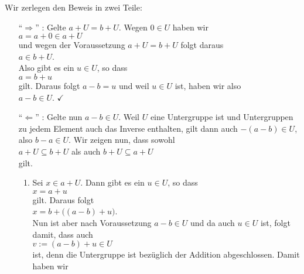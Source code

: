 \proof
Wir zerlegen den Beweis in zwei Teile:
\begin{enumerate}
\item[``$\Rightarrow$'']:
  Gelte $a + U = b + U$.  Wegen $0 \in U$ haben wir
  \\[0.2cm]
  \hspace*{1.3cm}
  $a = a + 0 \in a + U$
  \\[0.2cm]
  und wegen der Voraussetzung $a + U = b + U$ folgt daraus
  \\[0.2cm]
  \hspace*{1.3cm}
  $a \in b + U$.
  \\[0.2cm]
  Also gibt es ein $u \in U$, so dass
  \\[0.2cm]
  \hspace*{1.3cm}
  $a = b + u$
  \\[0.2cm]
  gilt.  Daraus folgt $a - b = u$ und weil $u \in U$ ist, haben wir also
  \\[0.2cm]
  \hspace*{1.3cm}
  $a - b \in U$.  $\checkmark$
\item[``$\Leftarrow$'']: Gelte nun $a - b \in U$.  Weil $U$ eine Untergruppe ist und Untergruppen zu jedem
  Element auch das Inverse enthalten, gilt dann auch $-(a -b) \in U$, also $b - a \in U$.  Wir zeigen
  nun, dass sowohl
  \\[0.2cm]
  \hspace*{1.3cm} 
  $a + U \subseteq b + U$ \quad als auch \quad
  $b + U \subseteq a + U$ 
  \\[0.2cm]
  gilt.
  \begin{enumerate}
  \item Sei $x \in a + U$.  Dann gibt es ein $u \in U$, so dass
        \\[0.2cm]
        \hspace*{1.3cm}
        $x = a + u$
        \\[0.2cm]
        gilt.  Daraus folgt
        \\[0.2cm]
        \hspace*{1.3cm}
        $x = b + \bigl((a - b) + u\bigr)$.
        \\[0.2cm]
        Nun ist aber nach Voraussetzung $a - b \in U$ und da auch $u \in U$ ist, folgt damit, dass auch
        \\[0.2cm]
        \hspace*{1.3cm}
        $v := (a - b) + u \in U$
        \\[0.2cm]
        ist, denn die Untergruppe ist bez\"{u}glich der Addition abgeschlossen.  Damit haben wir

\end{enumerate}
\end{enumerate}
